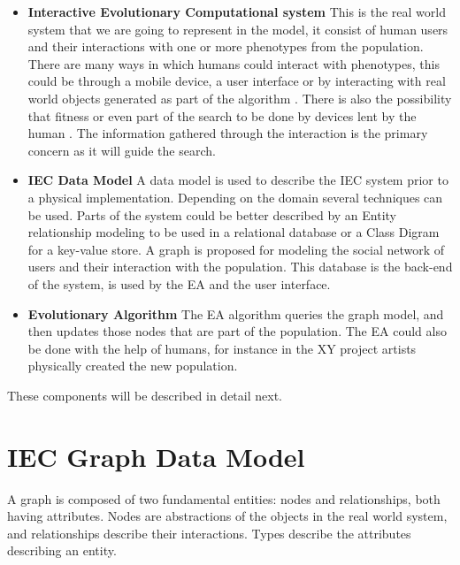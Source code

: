 \documentclass[conference]{IEEEtran}
\begin{document}
\begin{itemize}
  \item {\bf Interactive Evolutionary Computational system} 
  This is the real world system that we are going to represent in the model, 
  it consist of human users and their interactions with one or more phenotypes
  from
  the population. There are many ways in which humans could interact 
  with phenotypes, this could be through a mobile device, a user interface 
  or by interacting with real world objects generated as part of the algorithm 
  \cite{de2014artists,de2013unplugging}. 
  There is also the possibility that fitness or even part of the search 
  to be done by devices lent by the human \cite{DBLP:conf/gecco/MereloCGCRV16}.
  The information gathered through the interaction is the primary concern
  as it will guide the search. 

  \item {\bf IEC Data Model}
  A data model is used to describe the IEC system prior to a physical 
  implementation. 
  Depending on the domain several techniques can be used.
  Parts of the system could be better described by an Entity relationship 
  modeling to be used in a relational database or a Class Digram for a 
  key-value store. 
  A graph is proposed for modeling the social network
  of users and their interaction with the population. This database 
  is the back-end of the system, is used by the EA and the user interface. 

  \item {\bf Evolutionary Algorithm} 
  The EA algorithm queries the graph model, and then updates those nodes that 
  are part of the population. The EA could also be done with the help of
  humans, for instance in the XY project \cite{de2013unplugging} artists physically created
  the new population.  
\end{itemize}

These components will be described in detail next.

\section{IEC Graph Data Model} 

A graph is composed of two fundamental entities: nodes and relationships,
both having attributes. Nodes are abstractions of the objects in the real 
world system, and relationships describe their interactions. Types describe
the attributes describing an entity.
\end{document}
